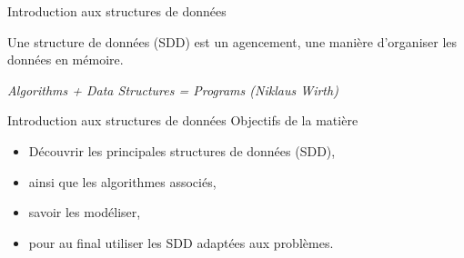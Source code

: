 \documentclass[12pt,a4paper,handout]{beamer}
\begin{document}
\begin{frame}{Introduction aux structures de données}
{}
\begin{definition}
Une structure de données (SDD) est un agencement, une manière d'organiser les données en mémoire.
\end{definition}

\pause
\vspace{25pt}
\emph{Algorithms + Data Structures = Programs (Niklaus Wirth)}

\end{frame}


\begin{frame}{Introduction aux structures de données}
{Objectifs de la matière}
\begin{itemize}
\item Découvrir les principales structures de données (SDD),
\item ainsi que les algorithmes associés, 
\item savoir les modéliser,
\item pour au final utiliser les SDD adaptées aux problèmes.
\end{itemize}

\end{frame}



%

%
%
%
%
%
%
%
%
%
%
%
%
\end{document}
